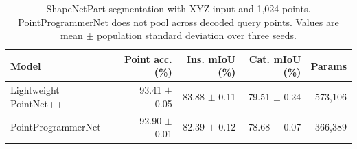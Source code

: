 \begin{table}[t]
\centering
\caption{ShapeNetPart segmentation with XYZ input and 1,024 points. PointProgrammerNet does not pool across decoded query points. Values are mean $\pm$ population standard deviation over three seeds.}
\label{tab:segmentation_accuracy}
\begin{tabular}{lrrrr}
\toprule
Model & Point acc. (\%) & Ins. mIoU (\%) & Cat. mIoU (\%) & Params \\
\midrule
Lightweight PointNet++ & 93.41 $\pm$ 0.05 & 83.88 $\pm$ 0.11 & 79.51 $\pm$ 0.24 & 573,106 \\
PointProgrammerNet & 92.90 $\pm$ 0.01 & 82.39 $\pm$ 0.12 & 78.68 $\pm$ 0.07 & 366,389 \\
\bottomrule
\end{tabular}
\end{table}


